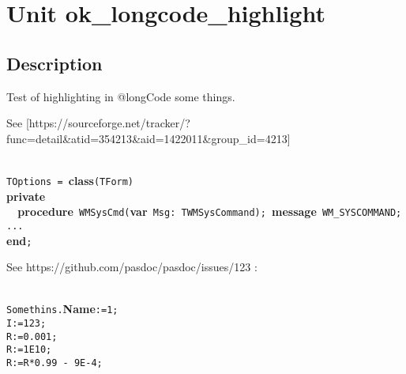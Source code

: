 \documentclass{report}
\begin{document}
\newlength{\tmplength}
\chapter{Unit ok{\_}longcode{\_}highlight}
\section{Description}
Test of highlighting in @longCode some things.\hfill\vspace*{1ex}



See [https://sourceforge.net/tracker/?func=detail{\&}atid=354213{\&}aid=1422011{\&}group{\_}id=4213]

\texttt{\\\nopagebreak[3]
TOptions~=~}\textbf{class}\texttt{(TForm)\\\nopagebreak[3]
}\textbf{private}\texttt{\\\nopagebreak[3]
~~}\textbf{procedure}\texttt{~WMSysCmd(}\textbf{var}\texttt{~Msg:~TWMSysCommand);~}\textbf{message}\texttt{~WM{\_}SYSCOMMAND;\\\nopagebreak[3]
...\\\nopagebreak[3]
}\textbf{end}\texttt{;\\
}

See https://github.com/pasdoc/pasdoc/issues/123 :

\texttt{\\\nopagebreak[3]
Somethins.}\textbf{Name}\texttt{:=1;\\\nopagebreak[3]
I:=123;\\\nopagebreak[3]
R:=0.001;\\\nopagebreak[3]
R:=1E10;\\\nopagebreak[3]
R:=R*0.99~-~9E-4;\\
}
\end{document}

